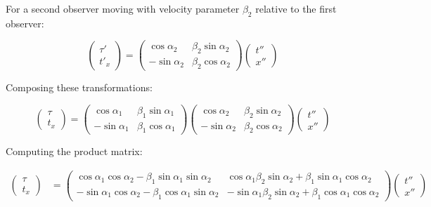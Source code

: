 \documentclass{article}
\begin{document}
For a second observer moving with velocity parameter $\beta_2$ relative to the first observer:

\begin{equation}
\begin{pmatrix} \tau' \\ t'_x \end{pmatrix} = 
\begin{pmatrix} \cos\alpha_2 & \beta_2\sin\alpha_2 \\ -\sin\alpha_2 & \beta_2\cos\alpha_2 \end{pmatrix}
\begin{pmatrix} t'' \\ x'' \end{pmatrix}
\end{equation}

Composing these transformations:

\begin{equation}
\begin{pmatrix} \tau \\ t_x \end{pmatrix} = 
\begin{pmatrix} \cos\alpha_1 & \beta_1\sin\alpha_1 \\ -\sin\alpha_1 & \beta_1\cos\alpha_1 \end{pmatrix}
\begin{pmatrix} \cos\alpha_2 & \beta_2\sin\alpha_2 \\ -\sin\alpha_2 & \beta_2\cos\alpha_2 \end{pmatrix}
\begin{pmatrix} t'' \\ x'' \end{pmatrix}
\end{equation}

Computing the product matrix:

\begin{align}
\begin{pmatrix} \tau \\ t_x \end{pmatrix} &= 
\begin{pmatrix} 
\cos\alpha_1\cos\alpha_2 - \beta_1\sin\alpha_1\sin\alpha_2 & \cos\alpha_1\beta_2\sin\alpha_2 + \beta_1\sin\alpha_1\cos\alpha_2 \\ 
-\sin\alpha_1\cos\alpha_2 - \beta_1\cos\alpha_1\sin\alpha_2 & -\sin\alpha_1\beta_2\sin\alpha_2 + \beta_1\cos\alpha_1\cos\alpha_2 
\end{pmatrix}
\begin{pmatrix} t'' \\ x'' \end{pmatrix}
\end{align}
\end{document}
